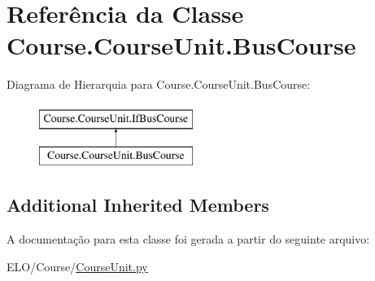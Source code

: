 \hypertarget{classCourse_1_1CourseUnit_1_1BusCourse}{\section{Referência da Classe Course.\-Course\-Unit.\-Bus\-Course}
\label{d9/d88/classCourse_1_1CourseUnit_1_1BusCourse}
}
Diagrama de Hierarquia para Course.\-Course\-Unit.\-Bus\-Course\-:\begin{figure}[H]
\begin{center}
\leavevmode
\includegraphics[height=2.000000cm]{d9/d88/classCourse_1_1CourseUnit_1_1BusCourse}
\end{center}
\end{figure}
\subsection*{Additional Inherited Members}


A documentação para esta classe foi gerada a partir do seguinte arquivo\-:\begin{DoxyCompactItemize}
\item 
E\-L\-O/\-Course/\hyperlink{CourseUnit_8py}{Course\-Unit.\-py}\end{DoxyCompactItemize}
